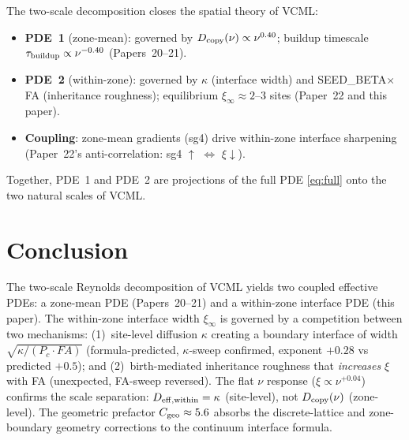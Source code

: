 \documentclass[11pt]{article}
\begin{document}
The two-scale decomposition closes the spatial theory of VCML:
\begin{itemize}
  \item \textbf{PDE~1} (zone-mean): governed by $D_{\rm copy}(\nu) \propto \nu^{0.40}$;
    buildup timescale $\tau_{\rm buildup} \propto \nu^{-0.40}$ (Papers~20--21).
  \item \textbf{PDE~2} (within-zone): governed by $\kappa$ (interface width)
    and SEED\_BETA$\times$FA (inheritance roughness); equilibrium $\xi_\infty \approx 2$--$3$
    sites (Paper~22 and this paper).
  \item \textbf{Coupling}: zone-mean gradients (sg4) drive within-zone interface
    sharpening (Paper~22's anti-correlation: sg4 $\uparrow$ $\Leftrightarrow$ $\xi \downarrow$).
\end{itemize}
Together, PDE~1 and PDE~2 are projections of the full PDE \eqref{eq:full}
onto the two natural scales of VCML.

\section{Conclusion}

The two-scale Reynolds decomposition of VCML yields two coupled effective PDEs:
a zone-mean PDE (Papers~20--21) and a within-zone interface PDE (this paper).
The within-zone interface width $\xi_\infty$ is governed by a competition between
two mechanisms:
(1)~site-level diffusion $\kappa$ creating a boundary interface of width
$\sqrt{\kappa/(P_c\cdot FA)}$ (formula-predicted, $\kappa$-sweep confirmed,
exponent $+0.28$ vs predicted $+0.5$);
and (2)~birth-mediated inheritance roughness that \emph{increases} $\xi$ with FA
(unexpected, FA-sweep reversed).
The flat $\nu$ response ($\xi \propto \nu^{+0.04}$) confirms the scale separation:
$D_{\rm eff,within} = \kappa$ (site-level), not $D_{\rm copy}(\nu)$ (zone-level).
The geometric prefactor $C_{\rm geo} \approx 5.6$ absorbs the discrete-lattice
and zone-boundary geometry corrections to the continuum interface formula.
\end{document}
